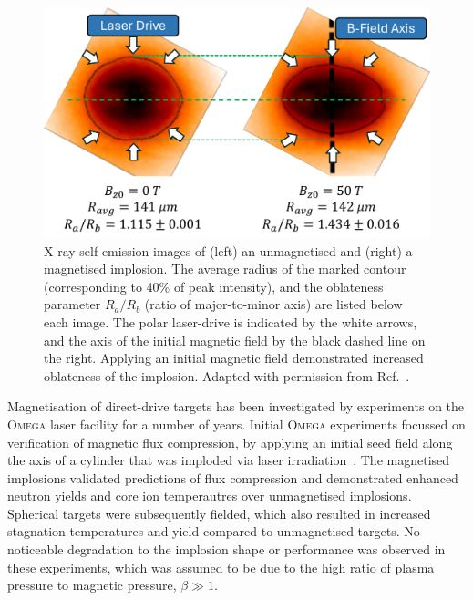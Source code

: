\begin{figure}[t!]
    \includegraphics[width=0.6\linewidth]{Results2/Images/MagP2_Bose.png}
    \centering
    \caption{X-ray self emission images of (left) an unmagnetised and (right) a magnetised implosion.
    The average radius of the marked contour (corresponding to 40\% of peak intensity), and the oblateness parameter $R_a/R_b$ (ratio of major-to-minor axis) are listed below each image.
    The polar laser-drive is indicated by the white arrows, and the axis of the initial magnetic field by the black dashed line on the right.
    Applying an initial magnetic field demonstrated increased oblateness of the implosion.
    Adapted with permission from Ref.~\cite{bose_effect_2022}.}%
    \label{fig:Res2_Bose_magp2}
\end{figure}

Magnetisation of direct-drive targets has been investigated by experiments on the \textsc{Omega} laser facility for a number of years.
Initial \textsc{Omega} experiments focussed on verification of magnetic flux compression, by applying an initial seed field along the axis of a cylinder that was imploded via laser irradiation~\cite{gotchev_laser-driven_2009}.
The magnetised implosions validated predictions of flux compression and demonstrated enhanced neutron yields and core ion temperautres over unmagnetised implosions.
Spherical targets were subsequently fielded, which also resulted in increased stagnation temperatures and yield compared to unmagnetised targets.
No noticeable degradation to the implosion shape or performance was observed in these experiments, which was assumed to be due to the high ratio of plasma pressure to magnetic pressure, $\beta\gg 1$.

